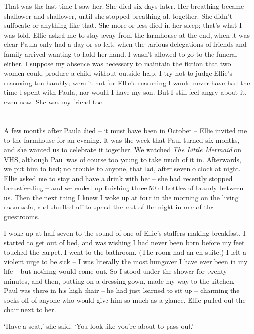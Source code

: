 That was the last time I saw her. She died six days later. Her breathing became shallower and shallower, until she stopped breathing all together. She didn't suffocate or anything like that. She more or less died in her sleep; that's what I was told. Ellie asked me to stay away from the farmhouse at the end, when it was clear Paula only had a day or so left, when the various delegations of friends and family arrived wanting to hold her hand. I wasn't allowed to go to the funeral either. I suppose my absence was necessary to maintain the fiction that two women could produce a child without outside help. I try not to judge Ellie's reasoning too harshly; were it not for Ellie's reasoning I would never have had the time I spent with Paula, nor would I have my son. But I still feel angry about it, even now. She was my friend too.

\section{}

A few months after Paula died -- it must have been in October -- Ellie invited me to the farmhouse for an evening. It was the week that Paul turned six months, and she wanted us to celebrate it together. We watched \textit{The Little Mermaid} on VHS, although Paul was of course too young to take much of it in. Afterwards, we put him to bed; no trouble to anyone, that lad, after seven o'clock at night. Ellie asked me to stay and have a drink with her -- she had recently stopped breastfeeding -- and we ended up finishing three 50 cl bottles of brandy between us. Then the next thing I knew I woke up at four in the morning on the living room sofa, and shuffled off to spend the rest of the night in one of the guestrooms.

I woke up at half seven to the sound of one of Ellie's staffers making breakfast. I started to get out of bed, and was wishing I had never been born before my feet touched the carpet. I went to the bathroom. (The room had an en suite.) I felt a violent urge to be sick -- I was literally the most hungover I have ever been in my life -- but nothing would come out. So I stood under the shower for twenty minutes, and then, putting on a dressing gown, made my way to the kitchen. Paul was there in his high chair -- he had just learned to sit up -- charming the socks off of anyone who would give him so much as a glance. Ellie pulled out the chair next to her.

`Have a seat,' she said. `You look like you're about to pass out.'

